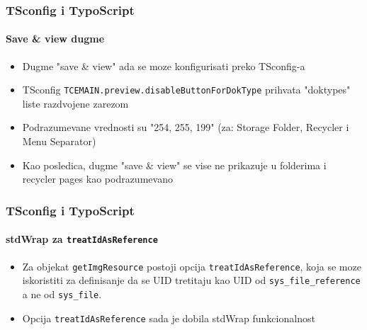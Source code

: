 \begin{frame}[fragile]
	\frametitle{TSconfig i TypoScript}
	\framesubtitle{Save \& view dugme}

	\begin{itemize}

		\item Dugme "save \& view" ada se moze konfigurisati preko TSconfig-a

		\item TSconfig \texttt{TCEMAIN.preview.disableButtonForDokType} prihvata "doktypes" liste razdvojene zarezom

		\item Podrazumevane vrednosti su "254, 255, 199" (za: Storage Folder, Recycler i Menu Separator)

		\item Kao posledica, dugme "save \& view" se vise ne prikazuje u folderima i recycler pages kao podrazumevano

	\end{itemize}

\end{frame}

\begin{frame}[fragile]
	\frametitle{TSconfig i TypoScript}
	\framesubtitle{stdWrap za \texttt{treatIdAsReference}}

	\begin{itemize}

		\item Za objekat \texttt{getImgResource} postoji opcija \texttt{treatIdAsReference},
			koja se moze iskoristiti za definisanje da se UID tretitaju kao UID od \texttt{sys\_file\_reference}
			a ne od \texttt{sys\_file}.

		\item Opcija \texttt{treatIdAsReference} sada je dobila stdWrap funkcionalnost


	\end{itemize}

\end{frame}

